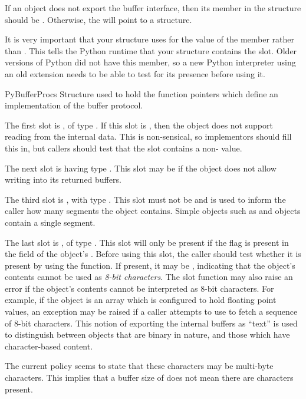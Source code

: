 \documentclass{manual}
\begin{document}
If an object does not export the buffer interface, then its
 member in the  structure
should be \NULL{}.  Otherwise, the  will point to
a  structure.

 It is very important that your
 structure uses  for the
value of the  member rather than .  This
tells the Python runtime that your  structure
contains the  slot. Older versions of Python
did not have this member, so a new Python interpreter using an old
extension needs to be able to test for its presence before using it.

\begin{ctypedesc}{PyBufferProcs}
Structure used to hold the function pointers which define an
implementation of the buffer protocol.

The first slot is , of type
.  If this slot is \NULL{}, then the object
does not support reading from the internal data.  This is
non-sensical, so implementors should fill this in, but callers should
test that the slot contains a non-\NULL{} value.

The next slot is  having type
. This slot may be \NULL{} if the object
does not allow writing into its returned buffers.

The third slot is , with type
.  This slot must not be \NULL{} and is used to 
inform the caller how many segments the object contains.  Simple
objects such as  and
 objects contain a single segment.

The last slot is , of type
.  This slot will only be present if the
 flag is present in the
 field of the object's .  Before using
this slot, the caller should test whether it is present by using the
 function.
If present, it may be \NULL, indicating that the object's contents
cannot be used as \emph{8-bit characters}.
The slot function may also raise an error if the object's contents
cannot be interpreted as 8-bit characters.  For example, if the object
is an array which is configured to hold floating point values, an
exception may be raised if a caller attempts to use
 to fetch a sequence of 8-bit characters.
This notion of exporting the internal buffers as ``text'' is used to
distinguish between objects that are binary in nature, and those which
have character-based content.

 The current policy seems to state that these characters
may be multi-byte characters. This implies that a buffer size of
 does not mean there are  characters present.
\end{ctypedesc}
\end{document}
